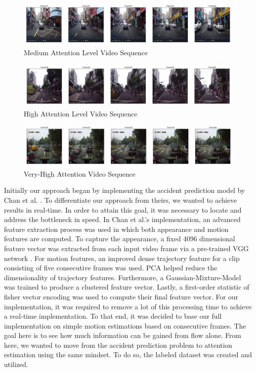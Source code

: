 \documentclass[10pt, conference, compsocconf]{IEEEtran}
\begin{document}
\begin{figure}[!t]
\centering
\includegraphics[width=6.5in]{images/level2}
\caption{Medium Attention Level Video Sequence}
\label{med}
\end{figure}

\begin{figure}[!t]
\centering
\includegraphics[width=6.5in]{images/level3}
\caption{High Attention Level Video Sequence}
\label{high}
\end{figure}

\begin{figure}[!t]
\centering
\includegraphics[width=6.5in]{images/level4}
\caption{Very-High Attention Video Sequence}
\label{veryhigh}
\end{figure}

Initially our approach began by implementing the accident prediction model by Chan et al. \cite{10.1007/978-3-319-54190-7_9}. To differentiate our approach from theirs, we wanted to achieve results in real-time. In order to attain this goal, it was necessary to locate and address the bottleneck in speed. In Chan et al.'s implementation, an advanced feature extraction process was used in which both appearance and motion features are computed. To capture the appearance, a fixed 4096 dimensional feature vector was extracted from each input video frame via a pre-trained VGG network \cite{DBLP:journals/corr/SimonyanZ14a}. For motion features, an improved dense trajectory feature \cite{6751553} for a clip consisting of five consecutive frames was used. PCA helped reduce the dimensionality of trajectory features. Furthermore, a Gaussian-Mixture-Model was trained to produce a clustered feature vector. Lastly, a first-order statistic of fisher vector encoding was used to compute their final feature vector. For our implementation, it was required to remove a lot of this processing time to achieve a real-time implementation. To that end, it was decided to base our full implementation on simple motion estimations based on consecutive frames. The goal here is to see how much information can be gained from flow alone. From here, we wanted to move from the accident prediction problem to attention estimation using the same mindset. To do so, the labeled dataset was created and utilized.
\end{document}
